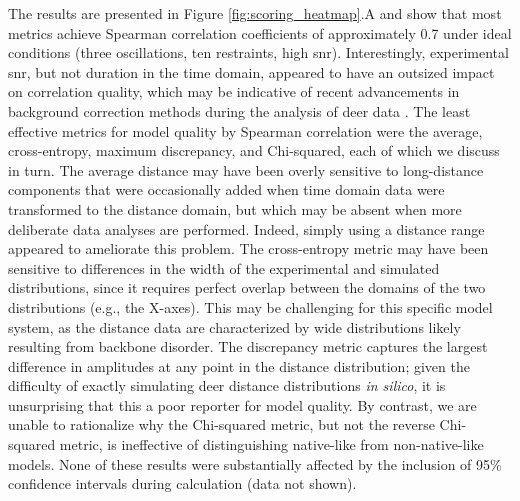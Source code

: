 The results are presented in Figure \ref{fig:scoring_heatmap}.A and show that most metrics achieve Spearman correlation coefficients of approximately 0.7 under ideal conditions (three oscillations, ten restraints, high \gls{snr}). Interestingly, experimental \gls{snr}, but not duration in the time domain, appeared to have an outsized impact on correlation quality, which may be indicative of recent advancements in background correction methods during the analysis of \gls{deer} data \citep*{FabregasIbanez2020}. The least effective metrics for model quality by Spearman correlation were the average, cross-entropy, maximum discrepancy, and Chi-squared, each of which we discuss in turn. The average distance may have been overly sensitive to long-distance components that were occasionally added when time domain data were transformed to the distance domain, but which may be absent when more deliberate data analyses are performed. Indeed, simply using a distance range appeared to ameliorate this problem. The cross-entropy metric may have been sensitive to differences in the width of the experimental and simulated distributions, since it requires perfect overlap between the domains of the two distributions (e.g., the X-axes). This may be challenging for this specific model system, as the distance data are characterized by wide distributions likely resulting from backbone disorder. The discrepancy metric captures the largest difference in amplitudes at any point in the distance distribution; given the difficulty of exactly simulating \gls{deer} distance distributions \emph{in silico}, it is unsurprising that this a poor reporter for model quality. By contrast, we are unable to rationalize why the Chi-squared metric, but not the reverse Chi-squared metric, is ineffective of distinguishing native-like from non-native-like models. None of these results were substantially affected by the inclusion of 95\% confidence intervals during calculation (data not shown).

